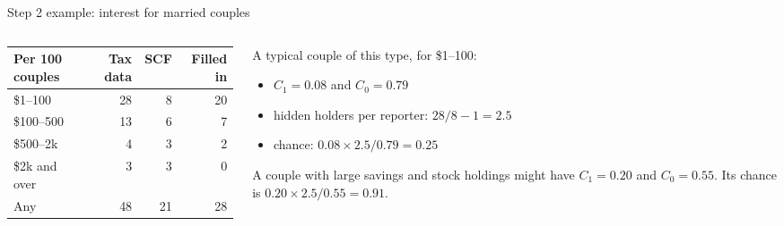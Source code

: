 \begin{frame}{Step 2 example: interest for married couples}
  \begin{columns}[T]
    \begin{column}{0.42\textwidth}
      \centering
      \small
      \begin{tabular}{lrrr}
        \toprule
        Per 100 couples & Tax data & SCF & Filled in \\
        \midrule
        \$1--100      & 28 & 8 & 20 \\
        \$100--500    & 13 & 6 & 7 \\
        \$500--2k     & 4  & 3 & 2 \\
        \$2k and over & 3  & 3 & 0 \\
        \midrule
        Any           & 48 & 21 & 28 \\
        \bottomrule
      \end{tabular}
    \end{column}
    \begin{column}{0.55\textwidth}
      \small
      A typical couple of this type, for \$1--100:
      \begin{itemize}
        \item $C_1 = 0.08$ and $C_0 = 0.79$
        \item hidden holders per reporter: $28/8 - 1 = 2.5$
        \item chance: $0.08 \times 2.5 / 0.79 = 0.25$
      \end{itemize}
      \vspace{0.3em}
      A couple with large savings and stock holdings might have $C_1 = 0.20$ and $C_0 = 0.55$.
      Its chance is $0.20 \times 2.5 / 0.55 = 0.91$.
    \end{column}
  \end{columns}
\end{frame}

